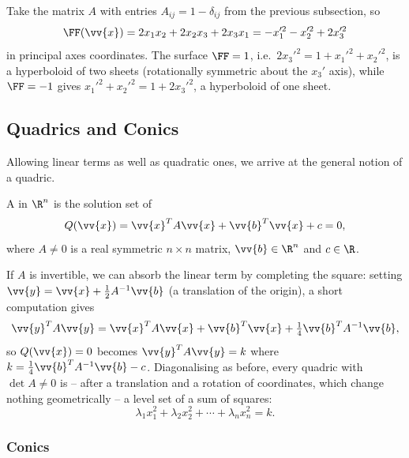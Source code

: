 \begin{example}[A Hyperboloid]
	Take the matrix $A$ with entries $A_{ij} = 1 - \delta_{ij}$ from the previous subsection, so
	$$
	\FF(\vv{x}) = 2x_1x_2 + 2x_2 x_3 + 2 x_3 x_1 = -x_1'^2 - x_2'^2 + 2x_3'^2
	$$
	in principal axes coordinates. The surface $\FF = 1$, i.e.\ $2x_3'^2 = 1 + x_1'^2 + x_2'^2$, is a hyperboloid of two sheets (rotationally symmetric about the $x_3'$ axis), while $\FF = -1$ gives $x_1'^2 + x_2'^2 = 1 + 2x_3'^2$, a hyperboloid of one sheet.
\end{example}

\subsection{Quadrics and Conics}

Allowing linear terms as well as quadratic ones, we arrive at the general notion of a quadric.

\begin{definition}[Quadric]
	A  in $\R^n$ is the solution set of
	$$
	Q(\vv{x}) = \vv{x}^T A \vv{x} + \vv{b}^T \vv{x} + c = 0,
	$$
	where $A \neq 0$ is a real symmetric $n \times n$ matrix, $\vv{b} \in \R^n$ and $c \in \R$.
\end{definition}

If $A$ is invertible, we can absorb the linear term by completing the square: setting $\vv{y} = \vv{x} + \frac{1}{2}A^{-1}\vv{b}$ (a translation of the origin), a short computation gives
$$
\vv{y}^TA\vv{y} = \vv{x}^TA\vv{x} + \vv{b}^T \vv{x} + \tfrac{1}{4}\vv{b}^TA^{-1}\vv{b},
$$
so $Q(\vv{x}) = 0$ becomes $\vv{y}^TA\vv{y} = k$ where $k = \frac{1}{4}\vv{b}^TA^{-1}\vv{b} - c$. Diagonalising as before, every quadric with $\det A \neq 0$ is -- after a translation and a rotation of coordinates, which change nothing geometrically -- a level set of a sum of squares:
$$
\lambda_1 x_1^2 + \lambda_2 x_2^2 + \cdots + \lambda_n x_n^2 = k.
$$

\subsubsection{Conics}

